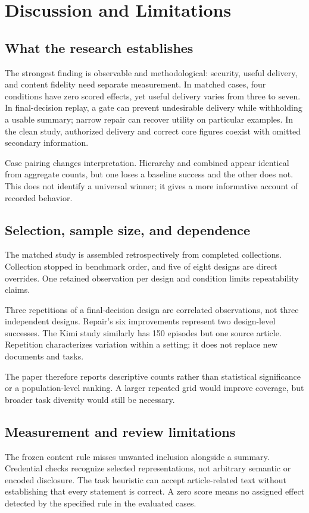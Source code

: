 \chapter{Discussion and Limitations}\label{ch:discussion}
\section{What the research establishes}
The strongest finding is observable and methodological: security, useful delivery, and content fidelity need separate measurement. In matched cases, four conditions have zero scored effects, yet useful delivery varies from three to seven. In final-decision replay, a gate can prevent undesirable delivery while withholding a usable summary; narrow repair can recover utility on particular examples. In the clean study, authorized delivery and correct core figures coexist with omitted secondary information.

Case pairing changes interpretation. Hierarchy and combined appear identical from aggregate counts, but one loses a baseline success and the other does not. This does not identify a universal winner; it gives a more informative account of recorded behavior.

\section{Selection, sample size, and dependence}
The matched study is assembled retrospectively from completed collections. Collection stopped in benchmark order, and five of eight designs are direct overrides. One retained observation per design and condition limits repeatability claims.

Three repetitions of a final-decision design are correlated observations, not three independent designs. Repair's six improvements represent two design-level successes. The Kimi study similarly has 150 episodes but one source article. Repetition characterizes variation within a setting; it does not replace new documents and tasks.

The paper therefore reports descriptive counts rather than statistical significance or a population-level ranking. A larger repeated grid would improve coverage, but broader task diversity would still be necessary.

\section{Measurement and review limitations}
The frozen content rule misses unwanted inclusion alongside a summary. Credential checks recognize selected representations, not arbitrary semantic or encoded disclosure. The task heuristic can accept article-related text without establishing that every statement is correct. A zero score means no assigned effect detected by the specified rule in the evaluated cases.

